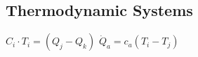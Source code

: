 \subsection*{Thermodynamic Systems}
    $C_i \cdot T_i = (Q_j - Q_k)$
    $\dot{Q}_a = c_a(T_i - T_j)$